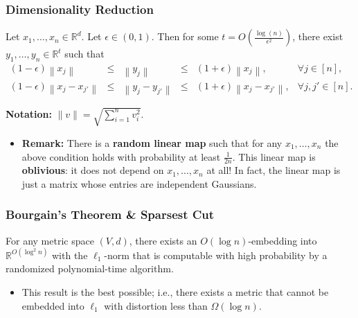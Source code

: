 \documentclass{beamer}
\newcommand{\RR}{\mathbb{R}}
\begin{document}
    \begin{frame}
        \frametitle{Dimensionality Reduction}
    
        \begin{theorem}
            Let $x_1, \ldots, x_n \in \RR^d$. Let $\epsilon \in (0, 1)$. Then for some $t = O(\frac{\log(n)}{\epsilon^2})$, there exist $y_1, \ldots, y_n \in \RR^t$ such that
            {\small
                $$
                \begin{array}{rcccll}
                    (1 - \epsilon) \left\lVert x_j \right\rVert & \leq & \left\lVert y_j \right\rVert & \leq & (1 + \epsilon) \left\lVert x_j \right\rVert, & \forall j \in [n], \\
                    (1 - \epsilon) \left\lVert x_j - x_{j'} \right\rVert & \leq & \left\lVert y_j - y_{j'} \right\rVert & \leq & (1 + \epsilon) \left\lVert x_j - x_{j'} \right\rVert, & \forall j, j' \in [n].
                \end{array}
                $$
            }

            \vspace{-1em}
            {\bf Notation:} $\lVert v \rVert = \sqrt{\sum_{i = 1}^n v_i^2}$.
        \end{theorem}

        \pause

        \begin{itemize}
            \item {\bf Remark:} There is a {\bf random linear map} such that for any $x_1, \ldots, x_n$ the above condition holds with probability at least $\frac{1}{2n}$. This linear map is {\bf oblivious}: it does not depend on $x_1, \ldots, x_n$ at all! In fact, the linear map is just a matrix whose entries are independent Gaussians.
        \end{itemize}
    \end{frame}

    \begin{frame}
        \frametitle{Bourgain's Theorem \& {\sc Sparsest Cut}}
    
        \begin{theorem}
            For any metric space $(V, d)$, there exists an $O(\log n)$-embedding into $\RR^{O(\log^2 n)}$ with the $\ell_1$-norm that is computable with high probability by a randomized polynomial-time algorithm.
        \end{theorem}

        \pause

        \begin{itemize}
            \item This result is the best possible; i.e., there exists a metric that cannot be embedded into $\ell_1$ with distortion less than $\Omega(\log n)$.
        \end{itemize}
    \end{frame}
\end{document}
